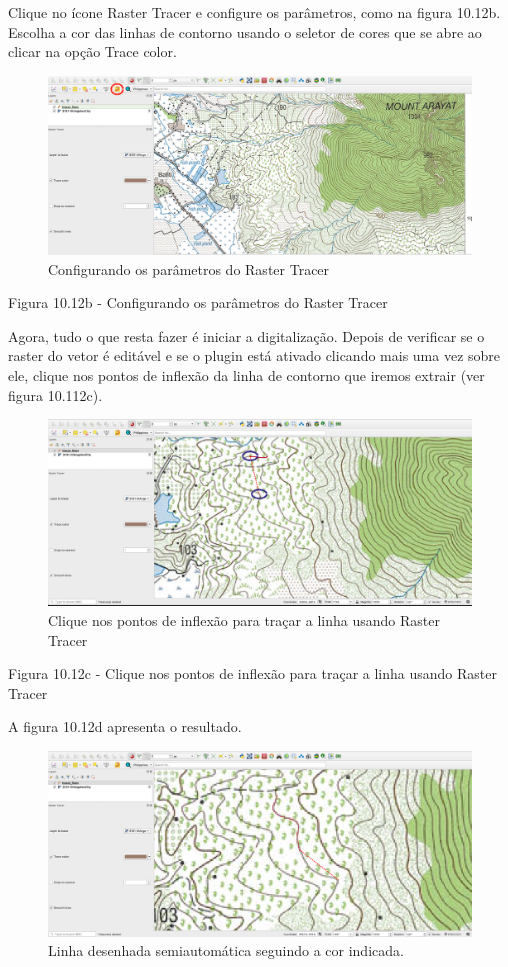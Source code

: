 \documentclass[
]{krantz}
\begin{document}
Clique no ícone Raster Tracer e configure os parâmetros, como na figura 10.12b. Escolha a cor das linhas de contorno usando o seletor de cores que se abre ao clicar na opção Trace color.

\begin{figure}
\centering
\includegraphics{media/modulo10/fig1012_b.png}
\caption{Configurando os parâmetros do Raster Tracer}
\end{figure}

Figura 10.12b - Configurando os parâmetros do Raster Tracer

Agora, tudo o que resta fazer é iniciar a digitalização. Depois de verificar se o raster do vetor é editável e se o plugin está ativado clicando mais uma vez sobre ele, clique nos pontos de inflexão da linha de contorno que iremos extrair (ver figura 10.112c).

\begin{figure}
\centering
\includegraphics{media/modulo10/fig1012_c.png}
\caption{Clique nos pontos de inflexão para traçar a linha usando Raster Tracer}
\end{figure}

Figura 10.12c - Clique nos pontos de inflexão para traçar a linha usando Raster Tracer

A figura 10.12d apresenta o resultado.

\begin{figure}
\centering
\includegraphics{media/modulo10/fig1012_d.png}
\caption{Linha desenhada semiautomática seguindo a cor indicada.}
\end{figure}
\end{document}
